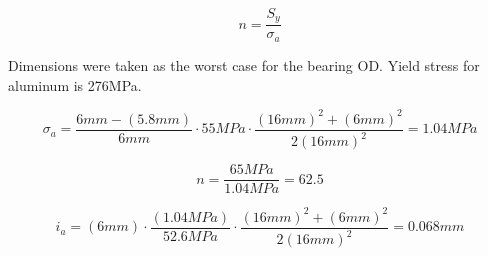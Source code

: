\documentclass[../main.tex]{subfiles}
\begin{document}
\begin{equation}
n=\frac{S_y}{\sigma_a}
\end{equation}

Dimensions were taken as the worst case for the bearing OD. Yield stress for aluminum is 276MPa.

\begin{equation*}
\sigma_a=\frac{6mm-(5.8mm)}{6mm}\cdot{}55MPa\cdot{}
\frac{(16mm)^2+(6mm)^2}{2(16mm)^2}=1.04MPa
\end{equation*}

\begin{equation*}
n=\frac{65MPa}{1.04MPa}=62.5
\end{equation*}

\begin{equation*}
i_a=(6mm)\cdot{}\frac{(1.04MPa)}{52.6MPa}\cdot{}
\frac{(16mm)^2+(6mm)^2}{2(16mm)^2}=0.068mm
\end{equation*}
\end{document}
